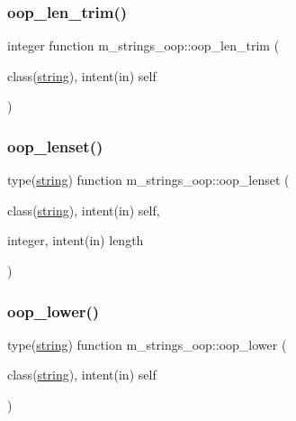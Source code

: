 \mbox{\label{namespacem__strings__oop_a1b9bf3c6aac71ce1782fb3116ffb63f8}} 
\subsubsection{\texorpdfstring{oop\+\_\+len\+\_\+trim()}{oop\_len\_trim()}}
{\footnotesize\ttfamily integer function m\+\_\+strings\+\_\+oop\+::oop\+\_\+len\+\_\+trim (\begin{DoxyParamCaption}\item[{class(\mbox{\hyperlink{structm__strings__oop_1_1string}{string}}), intent(in)}]{self }\end{DoxyParamCaption})\hspace{0.3cm}{\ttfamily [private]}}

\mbox{\label{namespacem__strings__oop_ac8ca18186659b8759b08e5167a3effb5}} 
\subsubsection{\texorpdfstring{oop\+\_\+lenset()}{oop\_lenset()}}
{\footnotesize\ttfamily type(\mbox{\hyperlink{structm__strings__oop_1_1string}{string}}) function m\+\_\+strings\+\_\+oop\+::oop\+\_\+lenset (\begin{DoxyParamCaption}\item[{class(\mbox{\hyperlink{structm__strings__oop_1_1string}{string}}), intent(in)}]{self,  }\item[{integer, intent(in)}]{length }\end{DoxyParamCaption})\hspace{0.3cm}{\ttfamily [private]}}

\mbox{\label{namespacem__strings__oop_ad49fed83544ede7b94948dee326ca3d7}} 
\subsubsection{\texorpdfstring{oop\+\_\+lower()}{oop\_lower()}}
{\footnotesize\ttfamily type(\mbox{\hyperlink{structm__strings__oop_1_1string}{string}}) function m\+\_\+strings\+\_\+oop\+::oop\+\_\+lower (\begin{DoxyParamCaption}\item[{class(\mbox{\hyperlink{structm__strings__oop_1_1string}{string}}), intent(in)}]{self }\end{DoxyParamCaption})\hspace{0.3cm}{\ttfamily [private]}}

